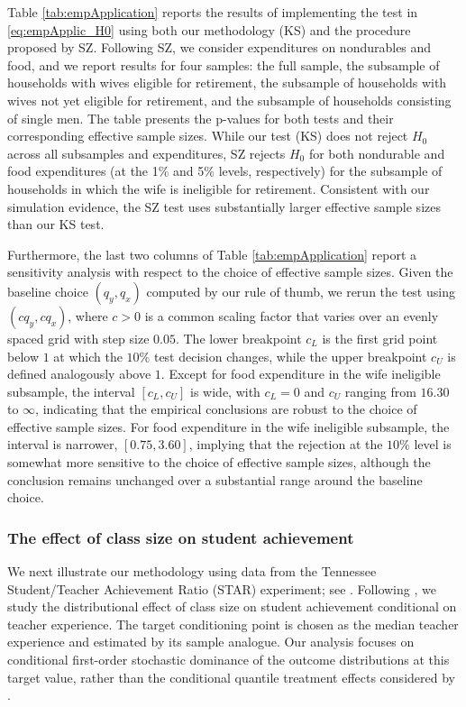 \documentclass[11pt]{article}
\numberwithin{equation}{section}
\begin{document}
Table \ref{tab:empApplication} reports the results of implementing the test in \eqref{eq:empApplic_H0} using both our methodology (KS) and the procedure proposed by SZ. Following SZ, we consider expenditures on nondurables and food, and we report results for four samples: the full sample, the subsample of households with wives eligible for retirement, the subsample of households with wives not yet eligible for retirement, and the subsample of households consisting of single men. The table presents the p-values for both tests and their corresponding effective sample sizes. While our test (KS) does not reject $H_0$ across all subsamples and expenditures, SZ rejects $H_0$ for both nondurable and food expenditures (at the 1\% and 5\% levels, respectively) for the subsample of households in which the wife is ineligible for retirement. Consistent with our simulation evidence, the SZ test uses substantially larger effective sample sizes than our KS test. 

Furthermore, the last two columns of Table \ref{tab:empApplication} report a sensitivity analysis with respect to the choice of effective sample sizes. Given the baseline choice $(q_y,q_x)$ computed by our rule of thumb, we rerun the test using $(cq_y,cq_x)$, where $c>0$ is a common scaling factor that varies over an evenly spaced grid with step size $0.05$. The lower breakpoint $c_L$ is the first grid point below $1$ at which the $10\%$ test decision changes, while the upper breakpoint $c_U$ is defined analogously above $1$. Except for food expenditure in the wife ineligible subsample, the interval $[c_L,c_U]$ is wide, with $c_L=0$ and $c_U$ ranging from $16.30$ to $\infty$, indicating that the empirical conclusions are robust to the choice of effective sample sizes. For food expenditure in the wife ineligible subsample, the interval is narrower, $[0.75,3.60]$, implying that the rejection at the $10\%$ level is somewhat more sensitive to the choice of effective sample sizes, although the conclusion remains unchanged over a substantial range around the baseline choice.


\subsubsection{The effect of class size on student achievement}
We next illustrate our methodology using data from the Tennessee Student/Teacher Achievement Ratio (STAR) experiment; see \cite{achilles/etal:2008data}. Following \citet{qu/yoon:2015}, we study the distributional effect of class size on student achievement conditional on teacher experience. The target conditioning point is chosen as the median teacher experience and estimated by its sample analogue. Our analysis focuses on conditional first-order stochastic dominance of the outcome distributions at this target value, rather than the conditional quantile treatment effects considered by \citet{qu/yoon:2015}.
\end{document}
